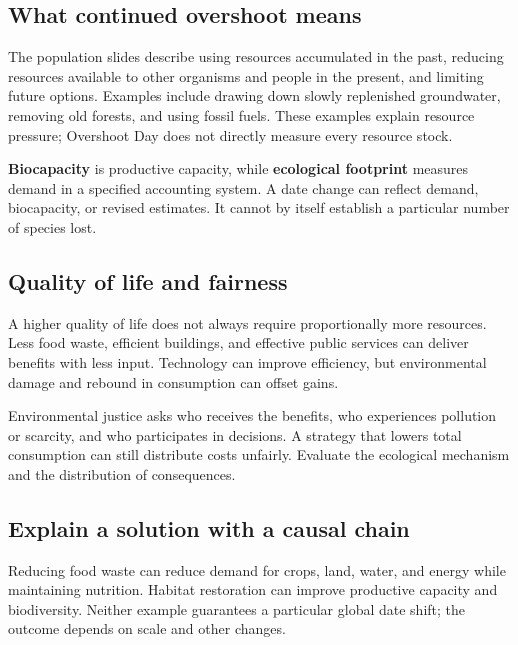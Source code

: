 \subsection*{What continued overshoot means}
The population slides describe using resources accumulated in the past, reducing resources available to other organisms and people in the present, and limiting future options. Examples include drawing down slowly replenished groundwater, removing old forests, and using fossil fuels. These examples explain resource pressure; Overshoot Day does not directly measure every resource stock.

\textbf{Biocapacity} is productive capacity, while \textbf{ecological footprint} measures demand in a specified accounting system. A date change can reflect demand, biocapacity, or revised estimates. It cannot by itself establish a particular number of species lost.
\subsection*{Quality of life and fairness}
A higher quality of life does not always require proportionally more resources. Less food waste, efficient buildings, and effective public services can deliver benefits with less input. Technology can improve efficiency, but environmental damage and rebound in consumption can offset gains.

Environmental justice asks who receives the benefits, who experiences pollution or scarcity, and who participates in decisions. A strategy that lowers total consumption can still distribute costs unfairly. Evaluate the ecological mechanism and the distribution of consequences.
\subsection*{Explain a solution with a causal chain}
Reducing food waste can reduce demand for crops, land, water, and energy while maintaining nutrition. Habitat restoration can improve productive capacity and biodiversity. Neither example guarantees a particular global date shift; the outcome depends on scale and other changes.

